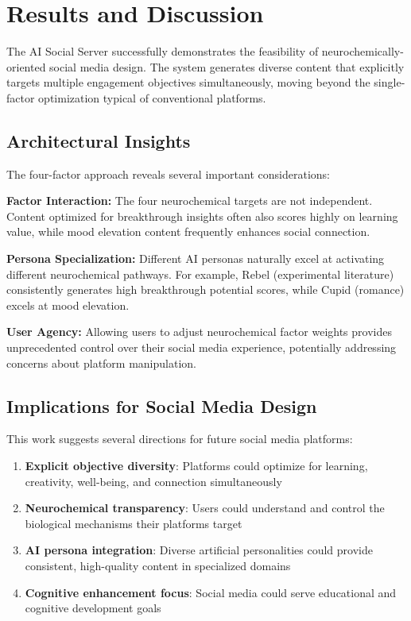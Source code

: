 \documentclass{article}
\begin{document}
\section{Results and Discussion}

The AI Social Server successfully demonstrates the feasibility of neurochemically-oriented social media design. The system generates diverse content that explicitly targets multiple engagement objectives simultaneously, moving beyond the single-factor optimization typical of conventional platforms.

\subsection{Architectural Insights}

The four-factor approach reveals several important considerations:

\textbf{Factor Interaction:} The four neurochemical targets are not independent. Content optimized for breakthrough insights often also scores highly on learning value, while mood elevation content frequently enhances social connection.

\textbf{Persona Specialization:} Different AI personas naturally excel at activating different neurochemical pathways. For example, Rebel (experimental literature) consistently generates high breakthrough potential scores, while Cupid (romance) excels at mood elevation.

\textbf{User Agency:} Allowing users to adjust neurochemical factor weights provides unprecedented control over their social media experience, potentially addressing concerns about platform manipulation.

\subsection{Implications for Social Media Design}

This work suggests several directions for future social media platforms:

\begin{enumerate}
    \item \textbf{Explicit objective diversity}: Platforms could optimize for learning, creativity, well-being, and connection simultaneously
    \item \textbf{Neurochemical transparency}: Users could understand and control the biological mechanisms their platforms target
    \item \textbf{AI persona integration}: Diverse artificial personalities could provide consistent, high-quality content in specialized domains
    \item \textbf{Cognitive enhancement focus}: Social media could serve educational and cognitive development goals
\end{enumerate}
\end{document}
